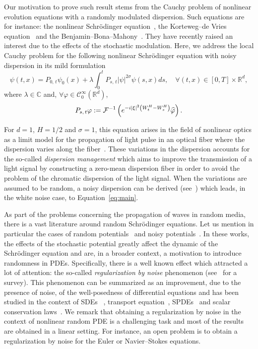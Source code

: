 \documentclass[10pt]{amsart}
\theoremstyle{definition}\newtheorem{defi}[theo]{Definition}\newtheorem{rema}[theo]{Remark}\newtheorem{exam}[theo]{Example}\newtheorem{exem}[theo]{Example}\newtheorem{nota}[theo]{Notation}
\newcommand{\bbR}{\mathbb{R}}
\newcommand{\bbC}{\mathbb{C}}
\newcommand{\clC}{\mathcal{C}}
\newcommand{\clF}{\mathcal{F}}
\let\oldhat\hat
\renewcommand*{\hat}[1]{\mathchoice{\widehat{#1}}{\widehat{#1}}{\oldhat{#1}}{\oldhat{#1}}}
\let\oldforall\forall
\renewcommand*{\forall}{\mathrel{\oldforall}}
\begin{document}
Our motivation to prove such result stems from the Cauchy problem of nonlinear evolution equations with a randomly modulated dispersion. Such equations are for instance: the nonlinear Schr\"odinger equation~\cite{belaouar2015numerical,chouk2015nonlinear,de2010nonlinear,debussche20111d}, the Korteweg--de Vries equation~\cite{chouk2015nonlinear} and the Benjamin--Bona--Mahony~\cite{chen2017generalized}. They have recently raised an interest due to the effects of the stochastic modulation. Here, we address the local Cauchy problem for the following nonlinear Schr\"odinger equation with noisy dispersion in its mild formulation
\begin{equation}\label{eq:main}
\psi(t,x) = P_{0,\,t} \psi_0(x) + \lambda \int_0^t P_{s,\,t} |\psi|^{2\sigma} \psi(s,x)ds,\quad \forall (t,x)\in[0,T]\times\bbR^d,
\end{equation}
where $\lambda \in\bbC$ and, $\forall \varphi\in\clC^{\infty}_0(\bbR^d)$,
\[
P_{s,\,t}\varphi : = \clF^{-1}\left(e^{-i|\xi|^2\left(W^H_t-W^H_s\right)} \hat{\varphi}\right).
\]

For $d=1$, $H=1/2$ and $\sigma = 1$, this equation arises in the field of nonlinear optics as a limit model for the propagation of light pulse in an optical fiber where the dispersion varies along the fiber~\cite{agrawal2001applications,agrawal2007nonlinear}. These variations in the dispersion accounts for the so-called \emph{dispersion management} which aims to improve the transmission of a light signal by constructing a zero-mean dispersion fiber in order to avoid the problem of the chromatic dispersion of the light signal. When the variations are assumed to be random, a noisy dispersion can be derived (see~\cite{de2010nonlinear,marty2006splitting}) which leads, in the white noise case, to Equation~\eqref{eq:main}.

As part of the problems concerning the propagation of waves in random media, there is a vast literature around random Schr\"odinger equations. Let us mention in particular the cases of random potentials~\cite{erdHos2008quantum,erdHos2000linear} and noisy potentials~\cite{de2002effect,de2005blow,de1999stochastic}. In these works, the effects of the stochastic potential greatly affect the dynamic of the Schr\"odinger equation and are, in a broader context, a motivation to introduce randomness in PDEs. Specifically, there is a well known effect which attracted a lot of attention: the so-called \emph{regularization by noise} phenomenon (see~\cite{flandoli2011random} for a survey). This phenomenon can be summarized as an improvement, due to the presence of noise, of the well-posedness of differential equations and has been studied in the context of SDEs
~\cite{CATELLIER20162323,krylov2005strong,priola2012pathwise,veretennikov1981strong,
zvonkin1974transformation}, transport equation~\cite{catellier2016rough,fedrizzi2013noise,flandoli2010well}, SPDEs~\cite{da2013strong} and scalar conservation laws~\cite{gess2017long}. We remark that obtaining a regularization by noise in the context of nonlinear random PDE is a challenging task and most of the results are obtained in a linear setting. For instance, an open problem is to obtain a regularization by noise for the Euler or Navier--Stokes equations.
\end{document}
